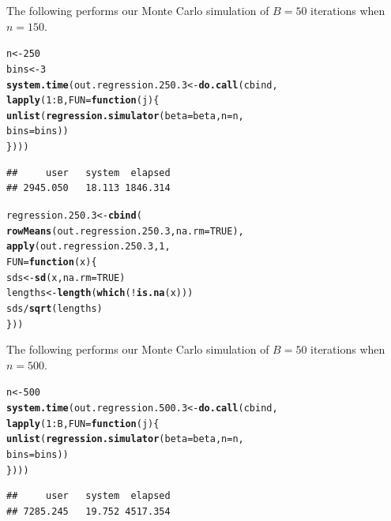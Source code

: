 \documentclass[11pt]{article}\usepackage[]{graphicx}\usepackage[]{color}
\makeatletter
\newcommand{\hlnum}[1]{\textcolor[rgb]{0.686,0.059,0.569}{#1}}%
\newcommand{\hlopt}[1]{\textcolor[rgb]{0,0,0}{#1}}%
\newcommand{\hlstd}[1]{\textcolor[rgb]{0.345,0.345,0.345}{#1}}%
\newcommand{\hlkwa}[1]{\textcolor[rgb]{0.161,0.373,0.58}{\textbf{#1}}}%
\newcommand{\hlkwb}[1]{\textcolor[rgb]{0.69,0.353,0.396}{#1}}%
\newcommand{\hlkwc}[1]{\textcolor[rgb]{0.333,0.667,0.333}{#1}}%
\newcommand{\hlkwd}[1]{\textcolor[rgb]{0.737,0.353,0.396}{\textbf{#1}}}%
\newenvironment{kframe}{%
 \def\at@end@of@kframe{}%
 \ifinner\ifhmode%
  \def\at@end@of@kframe{\end{minipage}}%
  \begin{minipage}{\columnwidth}%
 \fi\fi%
 \def\FrameCommand##1{\hskip\@totalleftmargin \hskip-\fboxsep
 \colorbox{shadecolor}{##1}\hskip-\fboxsep
     \hskip-\linewidth \hskip-\@totalleftmargin \hskip\columnwidth}%
 \MakeFramed {\advance\hsize-\width
   \@totalleftmargin\z@ \linewidth\hsize
   \@setminipage}}%
 {\par\unskip\endMakeFramed%
 \at@end@of@kframe}
\newenvironment{knitrout}{}{} %
\makeatother
\begin{document}
The following performs our Monte Carlo simulation of $B = 50$ iterations 
when $n = 150$.

\begin{knitrout}
\color{fgcolor}\begin{kframe}
\begin{alltt}
\hlstd{n} \hlkwb{<-} \hlnum{250}
\hlstd{bins} \hlkwb{<-} \hlnum{3}
\hlkwd{system.time}\hlstd{(out.regression.250.3} \hlkwb{<-} \hlkwd{do.call}\hlstd{(cbind,}
  \hlkwd{lapply}\hlstd{(}\hlnum{1}\hlopt{:}\hlstd{B,} \hlkwc{FUN} \hlstd{=} \hlkwa{function}\hlstd{(}\hlkwc{j}\hlstd{)\{}
    \hlkwd{unlist}\hlstd{(}\hlkwd{regression.simulator}\hlstd{(}\hlkwc{beta} \hlstd{= beta,} \hlkwc{n} \hlstd{= n,}
      \hlkwc{bins} \hlstd{= bins))}
\hlstd{\})))}
\end{alltt}
\begin{verbatim}
##     user   system  elapsed 
## 2945.050   18.113 1846.314
\end{verbatim}
\end{kframe}
\end{knitrout}

\begin{knitrout}
\color{fgcolor}\begin{kframe}
\begin{alltt}
\hlstd{regression.250.3} \hlkwb{<-} \hlkwd{cbind}\hlstd{(}
  \hlkwd{rowMeans}\hlstd{(out.regression.250.3,} \hlkwc{na.rm} \hlstd{=} \hlnum{TRUE}\hlstd{),}
  \hlkwd{apply}\hlstd{(out.regression.250.3,} \hlnum{1}\hlstd{,}
  \hlkwc{FUN} \hlstd{=} \hlkwa{function}\hlstd{(}\hlkwc{x}\hlstd{)\{}
    \hlstd{sds} \hlkwb{<-} \hlkwd{sd}\hlstd{(x,} \hlkwc{na.rm} \hlstd{=} \hlnum{TRUE}\hlstd{)}
    \hlstd{lengths} \hlkwb{<-} \hlkwd{length}\hlstd{(}\hlkwd{which}\hlstd{(}\hlopt{!}\hlkwd{is.na}\hlstd{(x)))}
    \hlstd{sds} \hlopt{/} \hlkwd{sqrt}\hlstd{(lengths)}
  \hlstd{\}))}
\end{alltt}
\end{kframe}
\end{knitrout}

The following performs our Monte Carlo simulation of $B = 50$ iterations 
when $n = 500$.

\begin{knitrout}
\color{fgcolor}\begin{kframe}
\begin{alltt}
\hlstd{n} \hlkwb{<-} \hlnum{500}
\hlkwd{system.time}\hlstd{(out.regression.500.3} \hlkwb{<-} \hlkwd{do.call}\hlstd{(cbind,}
  \hlkwd{lapply}\hlstd{(}\hlnum{1}\hlopt{:}\hlstd{B,} \hlkwc{FUN} \hlstd{=} \hlkwa{function}\hlstd{(}\hlkwc{j}\hlstd{)\{}
    \hlkwd{unlist}\hlstd{(}\hlkwd{regression.simulator}\hlstd{(}\hlkwc{beta} \hlstd{= beta,} \hlkwc{n} \hlstd{= n,}
      \hlkwc{bins} \hlstd{= bins))}
\hlstd{\})))}
\end{alltt}
\begin{verbatim}
##     user   system  elapsed 
## 7285.245   19.752 4517.354
\end{verbatim}
\end{kframe}
\end{knitrout}
\end{document}
